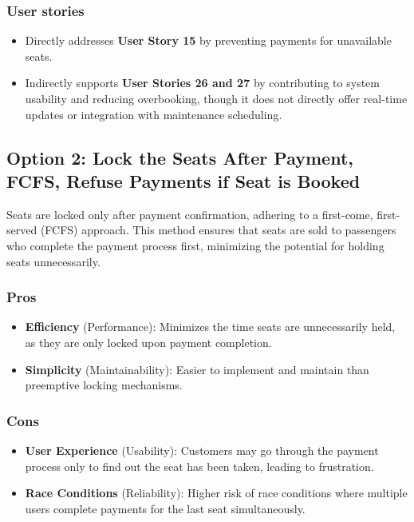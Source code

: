\subsubsection*{User stories}
\begin{itemize}
    \item Directly addresses \textbf{User Story 15} by preventing payments for unavailable seats.
    \item Indirectly supports \textbf{User Stories 26 and 27} by contributing to system usability and reducing overbooking, though it does not directly offer real-time updates or integration with maintenance scheduling.
\end{itemize}

\subsection*{Option 2: Lock the Seats After Payment, FCFS, Refuse Payments if Seat is Booked}
Seats are locked only after payment confirmation, adhering to a first-come, first-served (FCFS) approach. This method ensures that seats are sold to passengers who complete the payment process first, minimizing the potential for holding seats unnecessarily.

\subsubsection*{Pros}
\begin{itemize}[noitemsep]
    \item \textbf{Efficiency} (Performance): Minimizes the time seats are unnecessarily held, as they are only locked upon payment completion.
    \item \textbf{Simplicity} (Maintainability): Easier to implement and maintain than preemptive locking mechanisms.
\end{itemize}
\subsubsection*{Cons}
\begin{itemize}[noitemsep]
    \item \textbf{User Experience} (Usability): Customers may go through the payment process only to find out the seat has been taken, leading to frustration.
    \item \textbf{Race Conditions} (Reliability): Higher risk of race conditions where multiple users complete payments for the last seat simultaneously.
\end{itemize}

